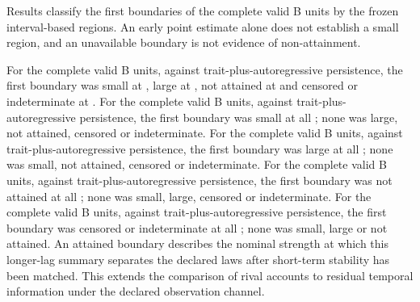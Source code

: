 Results classify the first boundaries of the complete valid B units by the frozen interval-based regions. %
An early point estimate alone does not establish a small region, and an unavailable boundary is not evidence of non-attainment. %

For the complete valid B units, against trait-plus-autoregressive persistence, the first boundary was small at  , large at , not attained at  and censored or indeterminate at . %
For the complete valid B units, against trait-plus-autoregressive persistence, the first boundary was small at all  ; none was large, not attained, censored or indeterminate. %
For the complete valid B units, against trait-plus-autoregressive persistence, the first boundary was large at all  ; none was small, not attained, censored or indeterminate. %
For the complete valid B units, against trait-plus-autoregressive persistence, the first boundary was not attained at all  ; none was small, large, censored or indeterminate. %
For the complete valid B units, against trait-plus-autoregressive persistence, the first boundary was censored or indeterminate at all  ; none was small, large or not attained. %
An attained boundary describes the nominal strength at which this longer-lag summary separates the declared laws after short-term stability has been matched. This extends the comparison of rival accounts to residual temporal information under the declared observation channel.

